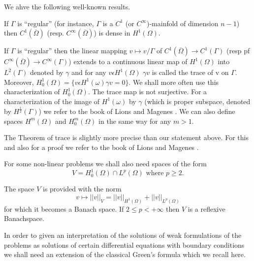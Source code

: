 We ahve the following well-known results.

\medskip
{} If $\Gamma$ is ``regular'' (for instance, $\Gamma$ is a $C^{1}$ (or $C^{\infty}$)-mainfold of dimension $n-1$) then $C^{1}(\overline{\Omega})$ (resp. $C^{\infty}(\overline{\Omega})$) is dense in $H^{1}(\Omega)$. 

\medskip
{} If $\Gamma$ is ``regular'' then the linear mapping $v \mapsto v/\Gamma$ of $C^{1}(\overline{\Omega}) \to C^{1}(\Gamma)$ (resp pf $C^{\infty} (\overline{\Omega}) \to C^{\infty} (\Gamma)$) extends to a continuous linear map of $H^{1}(\Omega)$ into $L^{2}(\Gamma)$ denoted by $\gamma$ and for any $v \epsilon H^{1} (\Omega)$ $\gamma v$ is called the trace of v on $\Gamma$. Moreover, $H_{0}^{1}(\Omega) = \{v \epsilon H^{1} (\omega) \gamma v = 0\}$. We shall more often use this characterization of $H_{0}^{1} (\Omega)$. The trace map is not surjective. For a characterization of the image of $H^{1} (\omega)$ by $\gamma$ (which is proper subspace, denoted by $H^{\frac{1}{2}}(\Gamma)$) we refer to the book of Lions and Magenes \cite{key32}. We can also define spaces $H^{m} (\Omega)$ and $H_{0}^{m} (\Omega)$ in the same way for any $m > 1$.

\begin{remark}\label{chap2-rem4.1}
The Theorem of trace is slightly more precise than our statement above. For this and also for a proof we refer to the book of Lions and Magenes \cite{key32}. 

For some non-linear problems we shall also need spaces of the form
\begin{equation*}
V = H_{0}^{1} (\Omega) \cap L^{p} (\Omega) \text{ where } p \geq 2.\tag{4.6}\label{chap2-eq4.6}
\end{equation*}

The space $V$ is provided with the norm
\begin{equation*}
v \mapsto ||v||_{V} = ||v||_{H^{1}(\Omega)} + ||v||_{L^{p}(\Omega)}
\end{equation*}
for which it becomes a Banach space. If $2 \leq p < + \infty$ then $V$ is a reflexive Banach\pageoriginale space.
\end{remark}

In order to given an interpretation of the solutions of weak formulations of the problems as solutions of certain differential equations with boundary conditions we shall need an extension of the classical Green's formula which we recall here.

